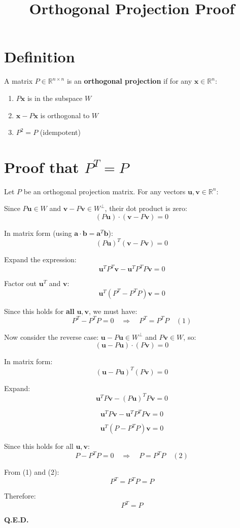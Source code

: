\documentclass{article}
\begin{document}
\title{Orthogonal Projection Proof}
\author{}
\date{}
\maketitle
\Large

\section*{Definition}
A matrix $P \in \mathbb{R}^{n \times n}$ is an \textbf{orthogonal projection} if for any $\mathbf{x} \in \mathbb{R}^n$:
\begin{enumerate}
    \item $P\mathbf{x}$ is in the subspace $W$
    \item $\mathbf{x} - P\mathbf{x}$ is orthogonal to $W$
    \item $P^2 = P$ (idempotent)
\end{enumerate}

\section*{Proof that $P^T = P$}

Let $P$ be an orthogonal projection matrix. For any vectors $\mathbf{u}, \mathbf{v} \in \mathbb{R}^n$:

Since $P\mathbf{u} \in W$ and $\mathbf{v} - P\mathbf{v} \in W^\perp$, their dot product is zero:
\[
(P\mathbf{u}) \cdot (\mathbf{v} - P\mathbf{v}) = 0
\]

In matrix form (using $\mathbf{a} \cdot \mathbf{b} = \mathbf{a}^T\mathbf{b}$):
\[
(P\mathbf{u})^T(\mathbf{v} - P\mathbf{v}) = 0
\]

Expand the expression:
\[
\mathbf{u}^T P^T \mathbf{v} - \mathbf{u}^T P^T P \mathbf{v} = 0
\]

Factor out $\mathbf{u}^T$ and $\mathbf{v}$:
\[
\mathbf{u}^T (P^T - P^T P) \mathbf{v} = 0
\]

Since this holds for \textbf{all} $\mathbf{u}, \mathbf{v}$, we must have:
\[
P^T - P^T P = 0 \quad \Rightarrow \quad P^T = P^T P \quad (1)
\]

Now consider the reverse case: $\mathbf{u} - P\mathbf{u} \in W^\perp$ and $P\mathbf{v} \in W$, so:
\[
(\mathbf{u} - P\mathbf{u}) \cdot (P\mathbf{v}) = 0
\]

In matrix form:
\[
(\mathbf{u} - P\mathbf{u})^T (P\mathbf{v}) = 0
\]

Expand:
\[
\mathbf{u}^T P \mathbf{v} - (P\mathbf{u})^T P \mathbf{v} = 0
\]

\[
\mathbf{u}^T P \mathbf{v} - \mathbf{u}^T P^T P \mathbf{v} = 0
\]

\[
\mathbf{u}^T (P - P^T P) \mathbf{v} = 0
\]

Since this holds for all $\mathbf{u}, \mathbf{v}$:
\[
P - P^T P = 0 \quad \Rightarrow \quad P = P^T P \quad (2)
\]

From (1) and (2):
\[
P^T = P^T P = P
\]

Therefore:
\[
\boxed{P^T = P}
\]

\textbf{Q.E.D.}
\end{document}
